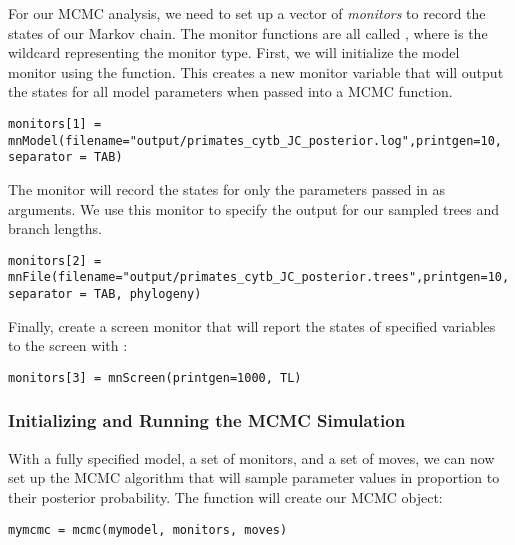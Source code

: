 For our MCMC analysis, we need to set up a vector of \textit{monitors} to record the states of our Markov chain. 
The monitor functions are all called , where \cl{*} is the wildcard representing the monitor type.
First, we will initialize the model monitor using the  function. This creates a new monitor variable that will output the states for all model parameters when passed into a MCMC function. 
{\tt \begin{snugshade*}
\begin{lstlisting}
monitors[1] = mnModel(filename="output/primates_cytb_JC_posterior.log",printgen=10, separator = TAB)
\end{lstlisting}
\end{snugshade*}}

The  monitor will record the states for only the parameters passed in as arguments. We use this monitor to specify the output for our sampled trees and branch lengths.

{\tt \begin{snugshade*}
\begin{lstlisting}
monitors[2] = mnFile(filename="output/primates_cytb_JC_posterior.trees",printgen=10, separator = TAB, phylogeny)
\end{lstlisting}
\end{snugshade*}}


Finally, create a screen monitor that will report the states of specified variables to the screen with :
{\tt \begin{snugshade*}
\begin{lstlisting}
monitors[3] = mnScreen(printgen=1000, TL)
\end{lstlisting}
\end{snugshade*}}

\subsubsection{Initializing and Running the MCMC Simulation}

With a fully specified model, a set of monitors, and a set of moves, we can now set up the MCMC algorithm that will sample parameter values in proportion to their posterior probability. The  function will create our MCMC object:
{\tt \begin{snugshade*}
\begin{lstlisting}
mymcmc = mcmc(mymodel, monitors, moves)
\end{lstlisting}
\end{snugshade*}}


